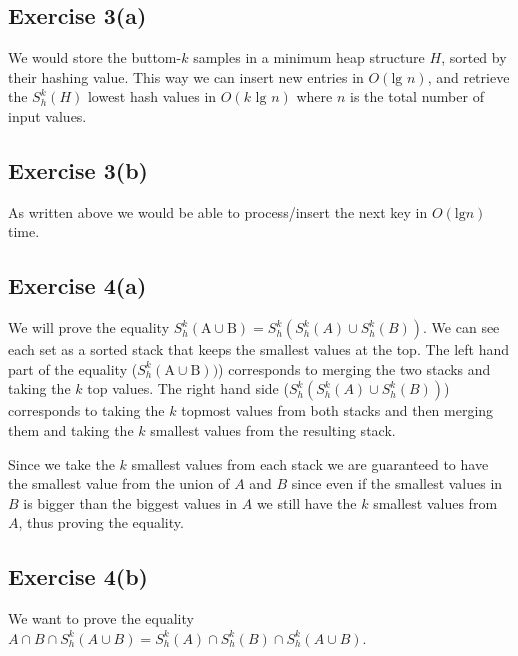 \subsection{Exercise 3(a)}
\label{sec:ex3a}
We would store the buttom-$k$ samples in a minimum heap structure $H$, sorted by
their hashing value. This way we can insert new entries in $O(\text{lg } n)$,
and retrieve the $S^{k}_{h}(H)$ lowest hash values in $O(k \text{ lg } n)$ where
$n$ is the total number of input values.

\subsection{Exercise 3(b)}
As written above we would be able to process/insert the next key in $O(\text{lg
} n)$ time.

\subsection{Exercise 4(a)}
We will prove the equality $S^{k}_{h}(\text{A} \cup \text{B}) =
S^{k}_{h}(S^{k}_{h}(A) \cup S^{k}_{h}(B))$.
%
We can see each set as a sorted stack that keeps the smallest values at the
top. The left hand part of the equality ($S^{k}_{h}(\text{A} \cup \text{B}))$)
corresponds to merging the two stacks and taking the $k$ top values.
%
The right hand side ($S^{k}_{h}(S^{k}_{h}(A) \cup S^{k}_{h}(B))$) corresponds to
taking the $k$ topmost values from both stacks and then merging them and taking
the $k$ smallest values from the resulting stack.

Since we take the $k$ smallest values from each stack we are guaranteed to have
the smallest value from the union of $A$ and $B$ since even if the smallest
values in $B$ is bigger than the biggest values in $A$ we still have the $k$
smallest values from $A$, thus proving the equality.

\subsection{Exercise 4(b)}


We want to prove the equality $A \cap B \cap S^{k}_{h}(A \cup B) = S^{k}_{h}(A)
\cap S^{k}_{h}(B) \cap S^{k}_{h}(A \cup B)$.

